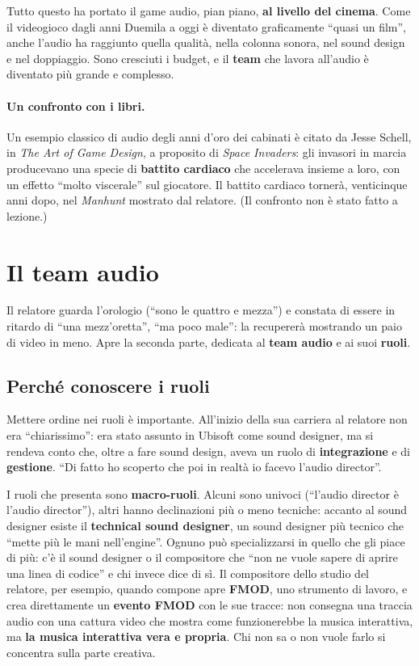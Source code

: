 Tutto questo ha portato il game audio, pian piano, \textbf{al livello del
cinema}. Come il videogioco dagli anni Duemila a oggi è diventato graficamente
``quasi un film'', anche l'audio ha raggiunto quella qualità, nella colonna
sonora, nel sound design e nel doppiaggio. Sono cresciuti i budget, e il
\textbf{team} che lavora all'audio è diventato più grande e complesso.

\paragraph{Un confronto con i libri.} Un esempio classico di audio degli anni
d'oro dei cabinati è citato da Jesse Schell, in \emph{The Art of Game Design},
a proposito di \emph{Space Invaders}: gli invasori in marcia producevano una
specie di \textbf{battito cardiaco} che accelerava insieme a loro, con un effetto
``molto viscerale'' sul giocatore. Il battito cardiaco tornerà, venticinque anni
dopo, nel \emph{Manhunt} mostrato dal relatore. (Il confronto non è stato fatto a
lezione.)

\section{Il team audio}
\label{z9:sec:team}

Il relatore guarda l'orologio (``sono le quattro e mezza'') e constata di essere
in ritardo di ``una mezz'oretta'', ``ma poco male'': la recupererà mostrando un
paio di video in meno. Apre la seconda parte, dedicata al \textbf{team audio} e ai
suoi \textbf{ruoli}.

\subsection{Perché conoscere i ruoli}

Mettere ordine nei ruoli è importante. All'inizio della sua carriera al relatore
non era ``chiarissimo'': era stato assunto in Ubisoft come sound designer, ma si
rendeva conto che, oltre a fare sound design, aveva un ruolo di
\textbf{integrazione} e di \textbf{gestione}. ``Di fatto ho scoperto che poi in
realtà io facevo l'audio director''.

I ruoli che presenta sono \textbf{macro-ruoli}. Alcuni sono univoci
(``l'audio director è l'audio director''), altri hanno declinazioni più o meno
tecniche: accanto al sound designer esiste il \textbf{technical sound designer},
un sound designer più tecnico che ``mette più le mani nell'engine''. Ognuno può
specializzarsi in quello che gli piace di più: c'è il sound designer o il
compositore che ``non ne vuole sapere di aprire una linea di codice'' e chi
invece dice di sì. Il compositore dello studio del relatore, per esempio, quando
compone apre \textbf{FMOD}, uno strumento di lavoro, e crea direttamente un
\textbf{evento FMOD} con le sue tracce: non consegna una traccia audio con una
cattura video che mostra come funzionerebbe la musica interattiva, ma
\textbf{la musica interattiva vera e propria}. Chi non sa o non vuole farlo si
concentra sulla parte creativa.

